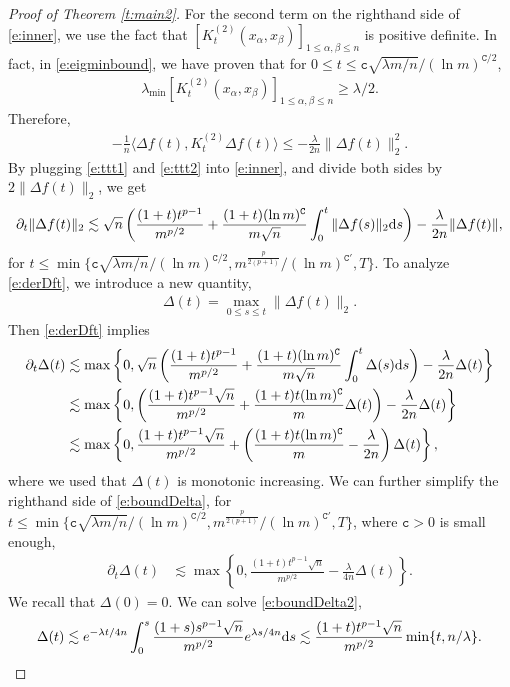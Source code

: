 \documentclass{article}
\numberwithin{equation}{section}
\newcommand{\fc}{{\mathtt c}}
\newcommand{\fC}{{\mathtt C}}
\newcommand{\rd}{{\rm d}}
\newcommand{\al}{\alpha}
\newcommand{\la}{\lambda}
\renewcommand{\leq}{\leqslant}
\renewcommand{\geq}{\geqslant}
\newcommand{\del}{\partial}
\newcommand{\1}{\mathds{1}}
\theoremstyle{plain} %
\begin{document}
\begin{proof}[Proof of Theorem \ref{t:main2}]
For the second term on the righthand side of \eqref{e:inner}, we use the fact that $[K_t^{(2)}(x_\al,x_\beta)]_{1\leq \al, \beta\leq n}$ is positive definite. In fact, in \eqref{e:eigminbound}, we have proven that for $0\leq t\leq \fc \sqrt{\la m /n }/(\ln m)^{\fC/2}$, 
\begin{align*}
\la_{\min} \left[K_t^{(2)}(x_\al, x_\beta)\right]_{1\leq \al, \beta\leq n}
\geq  \la/2.
\end{align*}
Therefore, 
\begin{align}\label{e:ttt2}
-\frac{1}{n}\langle \Delta f(t), K^{(2)}_t\Delta f(t)\rangle
\leq -\frac{\la}{2n}\|\Delta f(t)\|_2^2.
\end{align}
By plugging \eqref{e:ttt1} and \eqref{e:ttt2} into \eqref{e:inner}, and divide both sides by $2\|\Delta f(t)\|_2$, we get
\begin{align}\label{e:derDft}
\del_t \|\Delta f(t)\|_2
\lesssim \sqrt n\left(\frac{(1+t)t^{p-1}}{m^{p/2}}+\frac{(1+t)(\ln m)^{\fC}}{m\sqrt {n}}\int_0^t \|\Delta f(s)\|_2\rd s \right)-\frac{\la }{2n}\|\Delta f(t)\|,
\end{align}
for $t\leq \min\{\fc \sqrt{\la m/n}/(\ln m)^{\fC/2}, m^{\frac{p}{2(p+1)}}/(\ln m)^{\fC'}, T\}$.
To analyze \eqref{e:derDft}, we introduce a new quantity,
\begin{align*}
\Delta(t)=\max_{0\leq s\leq t}\|\Delta f(t)\|_2.
\end{align*}
Then \eqref{e:derDft} implies
\begin{align}\begin{split}\label{e:boundDelta}
\del_t\Delta(t)
&\lesssim \max\left\{0, \sqrt n\left(\frac{(1+t)t^{p-1}}{m^{p/2}}+\frac{(1+t)(\ln m)^{\fC}}{m\sqrt {n}}\int_0^t \Delta(s)\rd s \right)-\frac{\la }{2n}\Delta(t)\right\}\\
&\lesssim\max\left\{0, \left(\frac{(1+t)t^{p-1}\sqrt n}{m^{p/2}}+\frac{(1+t)t(\ln m)^{\fC}}{m} \Delta(t) \right)-\frac{\la }{2n}\Delta(t)\right\}\\
&\lesssim\max\left\{0, \frac{(1+t)t^{p-1}\sqrt n}{m^{p/2}}+\left(\frac{(1+t)t(\ln m)^{\fC}}{m}-\frac{\la}{2n}\right) \Delta(t) \right\},
\end{split}\end{align}
where we used that $\Delta(t)$ is monotonic increasing. We can further simplify the righthand side of \eqref{e:boundDelta}, for $t\leq \min\{\fc \sqrt{\la m/n}/(\ln m)^{\fC/2}, m^{\frac{p}{2(p+1)}}/(\ln m)^{\fC'}, T\}$, where $\fc>0$ is small enough, 
\begin{align}\label{e:boundDelta2}
\del_t\Delta(t)
&\lesssim\max\left\{0, \frac{(1+t)t^{p-1}\sqrt n}{m^{p/2}}-\frac{\la}{4n}\Delta(t) \right\}.
\end{align}
We recall that $\Delta(0)=0$. We can  solve \eqref{e:boundDelta2},
\begin{align*}
\Delta(t)\lesssim e^{-\la t/4n}\int_0^s\frac{(1+s)s^{p-1}\sqrt n}{m^{p/2}} e^{\la s/4n}\rd s\lesssim \frac{(1+t)t^{p-1}\sqrt n}{m^{p/2}} \min\{t, n/\la\}.
\end{align*}




\end{proof}
\end{document}
